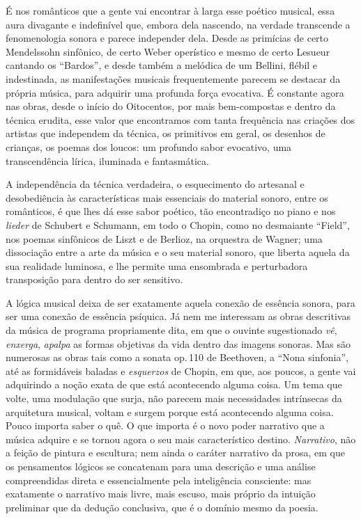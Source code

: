É nos românticos que a gente vai encontrar à larga esse poético musical,
essa aura divagante e indefinível que, embora dela nascendo, na verdade
transcende a fenomenologia sonora e parece independer dela. Desde as
primícias de certo Mendelssohn sinfônico, de certo Weber operístico e
mesmo de certo Lesueur cantando os ``Bardos'', e desde também a melódica
de um Bellini, flébil e indestinada, as manifestações musicais
frequentemente parecem se destacar da própria música, para adquirir uma
profunda força evocativa. É constante agora nas obras, desde o início do
Oitocentos, por mais bem-compostas e dentro da técnica erudita, esse
valor que encontramos com tanta frequência nas criações dos artistas que
independem da técnica, os primitivos em geral, os desenhos de crianças,
os poemas dos loucos: um profundo sabor evocativo, uma transcendência
lírica, iluminada e fantasmática.

A independência da técnica verdadeira, o esquecimento do artesanal e
desobediência às características mais essenciais do material sonoro,
entre os românticos, é que lhes dá esse sabor poético, tão encontradiço
no piano e nos \textit{lieder} de Schubert e Schumann, em todo o Chopin, como no
desmaiante ``Field'', nos poemas sinfônicos de Liszt e de Berlioz, na
orquestra de Wagner; uma dissociação entre a arte da música e o seu
material sonoro, que liberta aquela da sua realidade luminosa, e lhe
permite uma ensombrada e perturbadora transposição para dentro do ser
sensitivo.

A lógica musical deixa de ser exatamente aquela conexão de essência
sonora, para ser uma conexão de essência psíquica. Já nem me interessam
as obras descritivas da música de programa propriamente dita, em que o
ouvinte sugestionado \textit{vê}, \textit{enxerga}, \textit{apalpa} as formas objetivas
da vida dentro das imagens sonoras. Mas são numerosas as obras tais como
a sonata op.\,110 de Beethoven, a ``Nona sinfonia'', até as formidáveis
baladas e \textit{esquerzos} de Chopin, em que, aos poucos, a gente vai
adquirindo a noção exata de que está acontecendo alguma coisa. Um tema
que volte, uma modulação que surja, não parecem mais necessidades
intrínsecas da arquitetura musical, voltam e surgem porque está
acontecendo alguma coisa. Pouco importa saber o quê. O que importa é o
novo poder narrativo que a música adquire e se tornou agora o seu mais
característico destino. \textit{Narrativo}, não a feição de pintura e
escultura; nem ainda o caráter narrativo da prosa, em que os pensamentos
lógicos se concatenam para uma descrição e uma análise compreendidas
direta e essencialmente pela inteligência consciente: mas exatamente o
narrativo mais livre, mais escuso, mais próprio da intuição preliminar
que da dedução conclusiva, que é o domínio mesmo da poesia.

